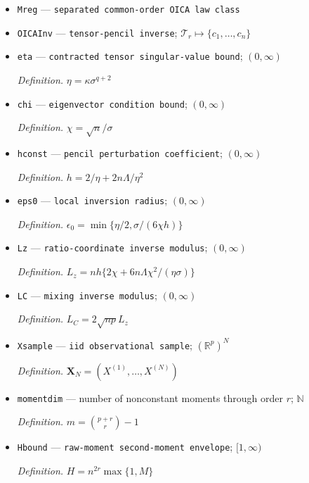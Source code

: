 \documentclass{article}
\begin{document}
\begin{itemize}
  \par\smallskip\noindent\emph{Definition.} \(V_d=[c_1^{\otimes d}\;\cdots\;c_n^{\otimes d}]\)
  \item \texttt{Mreg} --- \texttt{separated common-\allowbreak{}order OICA law class}
  \item \texttt{OICAInv} --- \texttt{tensor-\allowbreak{}pencil inverse}; \(\mathcal T_r\mapsto\{c_1,\ldots,c_n\}\)
  \item \texttt{eta} --- \texttt{contracted tensor singular-\allowbreak{}value bound}; \((0,\infty)\)
  \par\smallskip\noindent\emph{Definition.} \(\eta=\kappa\sigma^{q+2}\)
  \item \texttt{chi} --- \texttt{eigenvector condition bound}; \((0,\infty)\)
  \par\smallskip\noindent\emph{Definition.} \(\chi=\sqrt n/\sigma\)
  \item \texttt{hconst} --- \texttt{pencil perturbation coefficient}; \((0,\infty)\)
  \par\smallskip\noindent\emph{Definition.} \(h=2/\eta+2n\Lambda/\eta^2\)
  \item \texttt{eps0} --- \texttt{local inversion radius}; \((0,\infty)\)
  \par\smallskip\noindent\emph{Definition.} \(\epsilon_0=\min\{\eta/2,\sigma/(6\chi h)\}\)
  \item \texttt{Lz} --- \texttt{ratio-\allowbreak{}coordinate inverse modulus}; \((0,\infty)\)
  \par\smallskip\noindent\emph{Definition.} \(L_z=nh\{2\chi+6n\Lambda\chi^2/(\eta\sigma)\}\)
  \item \texttt{LC} --- \texttt{mixing inverse modulus}; \((0,\infty)\)
  \par\smallskip\noindent\emph{Definition.} \(L_C=2\sqrt{np}L_z\)
  \item \texttt{Xsample} --- \texttt{iid observational sample}; \((\mathbb R^p)^N\)
  \par\smallskip\noindent\emph{Definition.} \(\mathbf X_N=(X^{(1)},\ldots,X^{(N)})\)
  \item \texttt{momentdim} --- number of nonconstant moments through order \(r\); \(\mathbb N\)
  \par\smallskip\noindent\emph{Definition.} \(m=\binom{p+r}{r}-1\)
  \item \texttt{Hbound} --- \texttt{raw-\allowbreak{}moment second-\allowbreak{}moment envelope}; \([1,\infty)\)
  \par\smallskip\noindent\emph{Definition.} \(H=n^{2r}\max\{1,M\}\)

\end{itemize}
\end{document}
